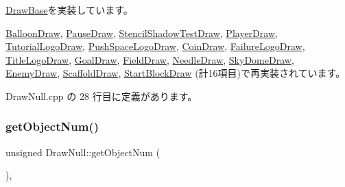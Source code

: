 \mbox{\hyperlink{class_draw_base_add488139aed539e7ccd19492702b4bee}{Draw\+Base}}を実装しています。



\mbox{\hyperlink{class_balloon_draw_ab6d1aa381df255809889d9f646154dc5}{Balloon\+Draw}}, \mbox{\hyperlink{class_pause_draw_ab6de445e905a481df0292de7fb1880fc}{Pause\+Draw}}, \mbox{\hyperlink{class_stencil_shadow_test_draw_a285b3045ff5cc34b6b2b991cca434bb3}{Stencil\+Shadow\+Test\+Draw}}, \mbox{\hyperlink{class_player_draw_ac618153d70492f73299c58a50d565431}{Player\+Draw}}, \mbox{\hyperlink{class_tutorial_logo_draw_a0e56784e25f1f83e6ff167280b801aad}{Tutorial\+Logo\+Draw}}, \mbox{\hyperlink{class_push_space_logo_draw_abaa66b6e3c46aa03bae21bad271eebc0}{Push\+Space\+Logo\+Draw}}, \mbox{\hyperlink{class_coin_draw_a8ebedf2582d53b40016ebd3f0e82c38e}{Coin\+Draw}}, \mbox{\hyperlink{class_failure_logo_draw_a45bb5d0965ca73b06ae0836f27f9b0e3}{Failure\+Logo\+Draw}}, \mbox{\hyperlink{class_title_logo_draw_a20a0e0c3569e49eb421ab4b5a65777cd}{Title\+Logo\+Draw}}, \mbox{\hyperlink{class_goal_draw_ac80c8da78cda7b15a4ce46f7d7057622}{Goal\+Draw}}, \mbox{\hyperlink{class_field_draw_a0894ddd73716f0db8ceed4b7d89f23fd}{Field\+Draw}}, \mbox{\hyperlink{class_needle_draw_a904f0aa7550f450f4b7bb2845c863e23}{Needle\+Draw}}, \mbox{\hyperlink{class_sky_dome_draw_a6b281bafa71c058ee83c373ad978e3bb}{Sky\+Dome\+Draw}}, \mbox{\hyperlink{class_enemy_draw_a1d8a943e4b625795bbd5ae614cc38ed1}{Enemy\+Draw}}, \mbox{\hyperlink{class_scaffold_draw_a5cbec566b4f66a0c87eca20e88c81b19}{Scaffold\+Draw}}, \mbox{\hyperlink{class_start_block_draw_a15cefedde4eab371fa2229d86c54455d}{Start\+Block\+Draw}} (計16項目)で再実装されています。



 Draw\+Null.\+cpp の 28 行目に定義があります。

\mbox{\label{class_draw_null_a8bddfa6ee87e47b2ecbbe6803b088e37}} 
\subsubsection{\texorpdfstring{get\+Object\+Num()}{getObjectNum()}}
{\footnotesize\ttfamily unsigned Draw\+Null\+::get\+Object\+Num (\begin{DoxyParamCaption}{ }\end{DoxyParamCaption})\hspace{0.3cm}{\ttfamily [override]}, {\ttfamily [virtual]}}



